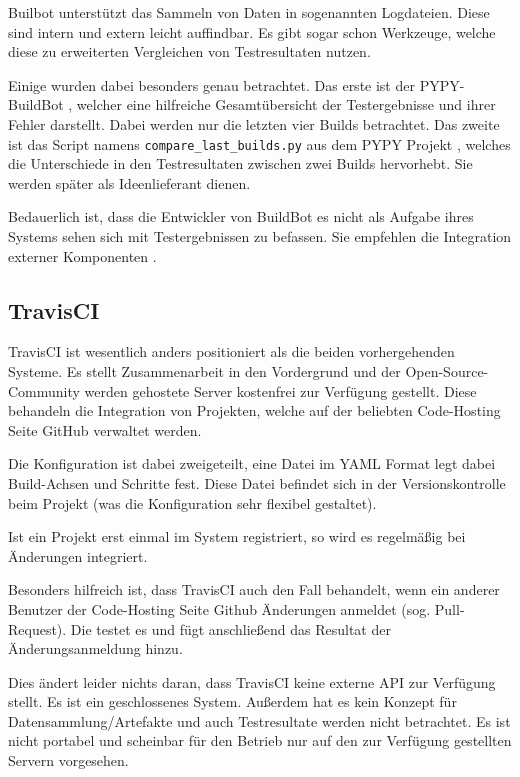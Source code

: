 Builbot unterst\"utzt das Sammeln von Daten in sogenannten Logdateien.
Diese sind intern und extern leicht auffindbar.
Es gibt sogar schon Werkzeuge, welche diese zu erweiterten Vergleichen von Testresultaten nutzen.

Einige wurden dabei besonders genau betrachtet.
Das erste ist der PYPY-BuildBot \cite{pypy:overview}, welcher eine hilfreiche Gesamtübersicht der Testergebnisse und ihrer Fehler darstellt.
Dabei werden nur die letzten vier Builds betrachtet.
Das zweite ist das Script namens \verb|compare_last_builds.py|
aus dem PYPY Projekt \cite{pypy:diffscript} ,
welches die Unterschiede in den Testresultaten zwischen zwei Builds hervorhebt.
Sie werden sp\"ater als Ideenlieferant dienen.

Bedauerlich ist, dass die Entwickler von BuildBot es nicht als Aufgabe ihres Systems sehen
sich mit Testergebnissen zu befassen.
Sie empfehlen die Integration externer Komponenten \cite{buildbot:irc}.

\subsection{TravisCI}


TravisCI \cite{travisci:website} ist wesentlich anders positioniert als die beiden vorhergehenden Systeme.
Es stellt Zusammenarbeit in den Vordergrund und der Open-Source-Community werden gehostete Server
kostenfrei zur Verf\"ugung gestellt.
Diese behandeln die Integration von Projekten,
welche auf der beliebten Code-Hosting Seite GitHub verwaltet werden.

Die Konfiguration ist dabei zweigeteilt,
eine Datei im \ac{YAML} Format \cite{yaml:website} legt dabei Build-Achsen und Schritte fest.
Diese Datei befindet sich in der Versionskontrolle beim Projekt
(was die Konfiguration sehr flexibel gestaltet).

Ist ein Projekt erst einmal im System registriert,
so wird es regelmäßig bei Änderungen integriert.

Besonders hilfreich ist, dass TravisCI auch den Fall behandelt,
wenn ein anderer Benutzer der Code-Hosting Seite Github \"Anderungen anmeldet
\cite{github:pullreq} (sog. Pull-Request).
Die testet es und f\"ugt anschließend das Resultat der \"Anderungsanmeldung hinzu.

Dies \"andert leider nichts daran, dass TravisCI keine externe API zur Verfügung stellt.
Es ist ein geschlossenes System. Außerdem hat es kein Konzept f\"ur Datensammlung/Artefakte
und auch Testresultate werden nicht betrachtet.
Es ist nicht portabel und scheinbar f\"ur den Betrieb nur
auf den zur Verfügung gestellten Servern vorgesehen.


